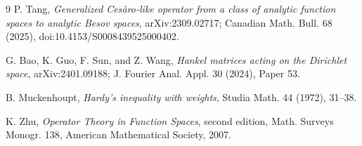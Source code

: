 \documentclass[11pt]{article}
\begin{document}
\begin{thebibliography}{9}
P. Tang,
\emph{Generalized Ces\`aro-like operator from a class of analytic function
spaces to analytic Besov spaces}, arXiv:2309.02717; Canadian Math. Bull. 68
(2025), doi:10.4153/S0008439525000402.

G. Bao, K. Guo, F. Sun, and Z. Wang,
\emph{Hankel matrices acting on the Dirichlet space},
arXiv:2401.09188; J. Fourier Anal. Appl. 30 (2024), Paper 53.

B. Muckenhoupt,
\emph{Hardy's inequality with weights},
Studia Math. 44 (1972), 31--38.

K. Zhu,
\emph{Operator Theory in Function Spaces}, second edition,
Math. Surveys Monogr. 138, American Mathematical Society, 2007.
\end{thebibliography}
\end{document}
